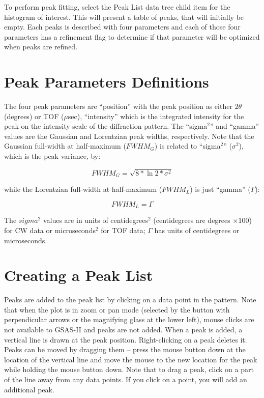 To perform peak fitting, select the Peak List data tree child item for the histogram of interest. This will present a table of peaks, that will initially be empty. Each peaks is described with four parameters and each of those four parameters has a refinement flag to determine if that parameter will be optimized when peaks are refined. 

\section{Peak Parameters Definitions}\label{ref:sigmadef}

The four peak parameters are ``position'' with the peak position as either $2\theta$ (degrees)
or TOF ($\mu$sec), ``intensity'' which is the integrated intensity for the peak on the intensity scale of the diffraction pattern. The ``sigma${}^2$'' and ``gamma'' values are the Gaussian and Lorentzian peak widths, respectively. 
Note that the Gaussian full-width at half-maximum ($FWHM_G$)  is related to ``sigma${}^2$'' ($\sigma^2$), which is the peak variance, by: 

$$FWHM_G = \sqrt{8 * \ln 2 * \sigma^ 2}$$

while the Lorentzian full-width at half-maximum ($FWHM_L$) is just ``gamma'' ($\Gamma$):

$$FWHM_L = \Gamma$$

The $sigma^2$  values are in units of centidegrees$^2$ (centidegrees are degrees $\times 100$) for CW data or microseconds${}^2$ for TOF data; 
$\Gamma$ has units of centidegrees or microseconds.  

\section{Creating a Peak List}
Peaks are added to the peak list by clicking on a data point in the pattern. Note that when the plot is in zoom or pan mode (selected by the button with perpendicular arrows or the magnifying glass at the lower left), mouse clicks are not available to GSAS-II and peaks are not added. When a peak is added, a vertical line is drawn at the peak position. Right-clicking on a peak deletes it. Peaks can be moved by dragging them -- press the mouse button down at the location of  the vertical line and move the mouse to the new location for the peak while holding the mouse button down. Note that to drag a peak, click on a part of the line away from any data points. If you click on a point, you will add an additional peak. 

